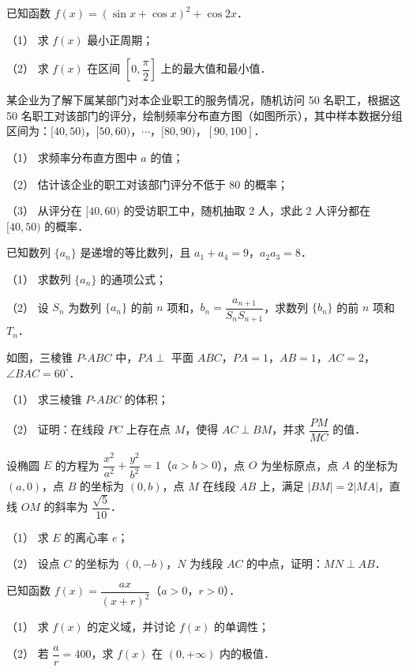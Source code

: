 \begin{question}
已知函数 \(f(x)=(\sin x+\cos x)^2+\cos 2x\)．

（1） 求 \(f(x)\) 最小正周期；

（2） 求 \(f(x)\) 在区间 \(\left[0,\dfrac{\pi}{2}\right]\) 上的最大值和最小值．

\Needspace{0.4\textheight}
\end{question}
\begin{question}
某企业为了解下属某部门对本企业职工的服务情况，随机访问 50 名职工，根据这 50 名职工对该部门的评分，绘制频率分布直方图（如图所示），其中样本数据分组区间为：\([40,50)\)，\([50,60)\)，\(\cdots\)，\([80,90)\)，\([90,100]\)．
\nopagebreak[4]
\begin{center}\end{center}
\nopagebreak[4]
（1） 求频率分布直方图中 \(a\) 的值；

（2） 估计该企业的职工对该部门评分不低于 80 的概率；

（3） 从评分在 \([40,60)\) 的受访职工中，随机抽取 2 人，求此 2 人评分都在 \([40,50)\) 的概率．

\end{question}
\begin{question}
已知数列 \(\{a_n\}\) 是递增的等比数列，且 \(a_1+a_4=9\)，\(a_2a_3=8\)．

（1） 求数列 \(\{a_n\}\) 的通项公式；

（2） 设 \(S_n\) 为数列 \(\{a_n\}\) 的前 \(n\) 项和，\(b_n=\dfrac{a_{n+1}}{S_nS_{n+1}}\)，求数列 \(\{b_n\}\) 的前 \(n\) 项和 \(T_n\)．

\Needspace{0.4\textheight}
\end{question}
\begin{question}
如图，三棱锥 \(P\text{-}ABC\) 中，\(PA\perp\) 平面 \(ABC\)，\(PA=1\)，\(AB=1\)，\(AC=2\)，\(\angle BAC=60^{\circ}\)．
\nopagebreak[4]
\begin{center}\end{center}
\nopagebreak[4]
（1） 求三棱锥 \(P\text{-}ABC\) 的体积；

（2） 证明：在线段 \(PC\) 上存在点 \(M\)，使得 \(AC\perp BM\)，并求 \(\dfrac{PM}{MC}\) 的值．

\end{question}
\begin{question}
设椭圆 \(E\) 的方程为 \(\dfrac{x^2}{a^2}+\dfrac{y^2}{b^2}=1\)（\(a>b>0\)），点 \(O\) 为坐标原点，点 \(A\) 的坐标为 \((a,0)\)，点 \(B\) 的坐标为 \((0,b)\)，点 \(M\) 在线段 \(AB\) 上，满足 \(|BM|=2|MA|\)，直线 \(OM\) 的斜率为 \(\dfrac{\sqrt{5}}{10}\)．

（1） 求 \(E\) 的离心率 \(e\)；

（2） 设点 \(C\) 的坐标为 \((0,-b)\)，\(N\) 为线段 \(AC\) 的中点，证明：\(MN\perp AB\)．

\end{question}
\begin{question}
已知函数 \(f(x)=\dfrac{ax}{(x+r)^2}\)（\(a>0\)，\(r>0\)）．

（1） 求 \(f(x)\) 的定义域，并讨论 \(f(x)\) 的单调性；

（2） 若 \(\dfrac{a}{r}=400\)，求 \(f(x)\) 在 \((0,+\infty)\) 内的极值．

\end{question}
